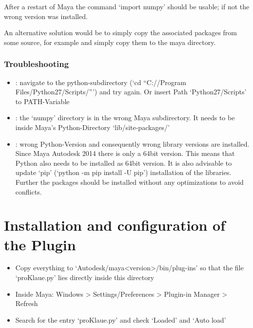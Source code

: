 \documentclass[letterpaper,10pt,english]{sphinxmanual}
\begin{document}
After a restart of Maya the command ‘import numpy’ should be usable; if not the wrong version was installed.

An alternative solution would be to simply copy the associated packages from some source, for example  and simply copy them to the maya directory.


\subsection{Troubleshooting}
\label{\detokenize{index:troubleshooting}}\begin{itemize}
\item {} 
: navigate to the python-subdirectory  (‘cd “C://Program Files/Python27/Scripts/”’) and try again. Or insert Path ‘Python27/Scripts’ to PATH-Variable

\item {} 
: the ‘numpy’ directory is in the wrong Maya subdirectory. It needs to be inside Maya’s Python-Directory ‘lib/site-packages/’

\item {} 
: wrong Python-Version and consequently wrong library versions are installed. Since Maya Autodesk 2014 there is only a 64bit version. This means that Python also needs to be installed as 64bit version. It is also advisable to update ‘pip’ (‘python -m pip install -U pip’)  installation of the libraries. Further the packages should be installed without any optimizations to avoid conflicts.

\end{itemize}


\chapter{Installation and configuration of the Plugin}
\label{\detokenize{index:installation-and-configuration-of-the-plugin}}\begin{itemize}
\item {} 
Copy everything to ‘Autodesk/maya\textless{}version\textgreater{}/bin/plug-ins’ so that the file ‘proKlaue.py’ lies directly inside this directory

\item {} 
Inside Maya: Windows \textendash{}\textgreater{} Settings/Preferences \textendash{}\textgreater{} Plugin-in Manager \textendash{}\textgreater{} Refresh

\item {} 
Search for the entry ‘proKlaue.py’ and check ‘Loaded’ and ‘Auto load’

\end{itemize}
\end{document}
